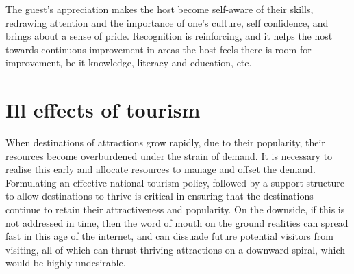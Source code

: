 The guest's appreciation makes the host become self-aware of their skills, redrawing attention and the importance of one's culture, self confidence, and brings about a sense of pride. Recognition is reinforcing, and it helps the host towards continuous improvement in areas the host feels there is room for improvement, be it knowledge, literacy and education, etc.


\section{Ill effects of tourism} %
\label{sec:iet}

When destinations of attractions grow rapidly, due to their popularity, their resources become overburdened under the strain of demand. It is necessary to realise this early and allocate resources to manage and offset the demand. Formulating an effective national tourism policy, followed by a support structure to allow destinations to thrive is critical in ensuring that the destinations continue to retain their attractiveness and popularity. On the downside, if this is not addressed in time, then the word of mouth on the ground realities can spread fast in this age of the internet, and can dissuade future potential visitors from visiting, all of which can thrust thriving attractions on a downward spiral, which would be highly undesirable.



